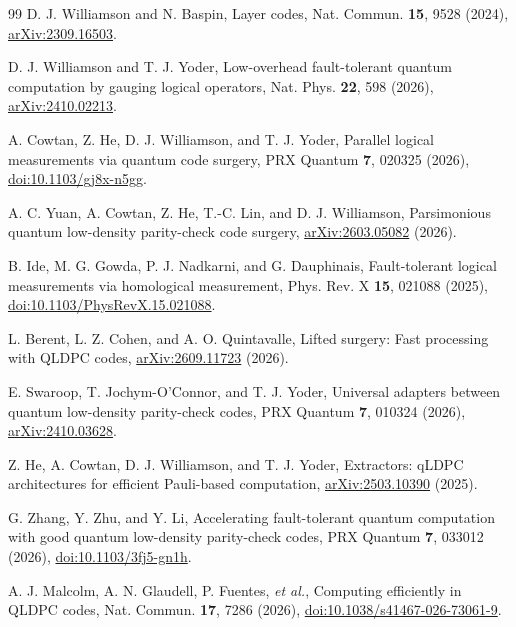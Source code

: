 \begin{thebibliography}{99}
D. J. Williamson and N. Baspin, Layer codes, Nat. Commun. \textbf{15}, 9528 (2024), \href{https://arxiv.org/abs/2309.16503}{arXiv:2309.16503}.

D. J. Williamson and T. J. Yoder, Low-overhead fault-tolerant quantum computation by gauging logical operators, Nat. Phys. \textbf{22}, 598 (2026), \href{https://arxiv.org/abs/2410.02213}{arXiv:2410.02213}.

A. Cowtan, Z. He, D. J. Williamson, and T. J. Yoder, Parallel logical measurements via quantum code surgery, PRX Quantum \textbf{7}, 020325 (2026), \href{https://doi.org/10.1103/gj8x-n5gg}{doi:10.1103/gj8x-n5gg}.

A. C. Yuan, A. Cowtan, Z. He, T.-C. Lin, and D. J. Williamson, Parsimonious quantum low-density parity-check code surgery, \href{https://arxiv.org/abs/2603.05082}{arXiv:2603.05082} (2026).

B. Ide, M. G. Gowda, P. J. Nadkarni, and G. Dauphinais, Fault-tolerant logical measurements via homological measurement, Phys. Rev. X \textbf{15}, 021088 (2025), \href{https://doi.org/10.1103/PhysRevX.15.021088}{doi:10.1103/PhysRevX.15.021088}.

L. Berent, L. Z. Cohen, and A. O. Quintavalle, Lifted surgery: Fast processing with QLDPC codes, \href{https://arxiv.org/abs/2609.11723}{arXiv:2609.11723} (2026).

E. Swaroop, T. Jochym-O'Connor, and T. J. Yoder, Universal adapters between quantum low-density parity-check codes, PRX Quantum \textbf{7}, 010324 (2026), \href{https://arxiv.org/abs/2410.03628}{arXiv:2410.03628}.

Z. He, A. Cowtan, D. J. Williamson, and T. J. Yoder, Extractors: qLDPC architectures for efficient Pauli-based computation, \href{https://arxiv.org/abs/2503.10390}{arXiv:2503.10390} (2025).

G. Zhang, Y. Zhu, and Y. Li, Accelerating fault-tolerant quantum computation with good quantum low-density parity-check codes, PRX Quantum \textbf{7}, 033012 (2026), \href{https://doi.org/10.1103/3fj5-gn1h}{doi:10.1103/3fj5-gn1h}.

A. J. Malcolm, A. N. Glaudell, P. Fuentes, \emph{et al.}, Computing efficiently in QLDPC codes, Nat. Commun. \textbf{17}, 7286 (2026), \href{https://doi.org/10.1038/s41467-026-73061-9}{doi:10.1038/s41467-026-73061-9}.


\end{thebibliography}
